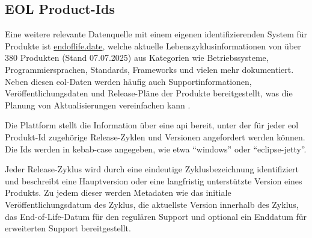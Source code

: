 \subsection{EOL Product-Ids}\label{subsec:eol-product-ids}

Eine weitere relevante Datenquelle mit einem eigenen identifizierenden System für Produkte ist \href{https://endoflife.date}{endoflife.date}, welche aktuelle Lebenszyklusinformationen von über 380 Produkten (Stand 07.07.2025) aus Kategorien wie Betriebssysteme, Programmiersprachen, Standards, Frameworks und vielen mehr dokumentiert.
Neben diesen \acrshort{eol}-Daten werden häufig auch Supportinformationen, Veröffentlichungsdaten und Release-Pläne der Produkte bereitgestellt, was die Planung von Aktualisierungen vereinfachen kann \autocite{EndOfLifeDateHomepage}.

Die Plattform stellt die Information über eine \acrshort{api} bereit, unter der für jeder \acrshort{eol} Produkt-Id zugehörige Release-Zyklen und Versionen angefordert werden können.
Die Ids werden in kebab-case angegeben, wie etwa \enquote{windows} oder \enquote{eclipse-jetty}.

Jeder Release-Zyklus wird durch eine eindeutige Zyklusbezeichnung identifiziert und beschreibt eine Hauptversion oder eine langfristig unterstützte Version eines Produkts.
Zu jedem dieser werden Metadaten wie das initiale Veröffentlichungsdatum des Zyklus, die aktuellste Version innerhalb des Zyklus, das End-of-Life-Datum für den regulären Support und optional ein Enddatum für erweiterten Support bereitgestellt.


